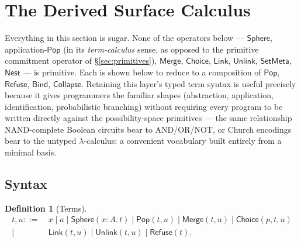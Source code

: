 \documentclass[12pt]{article}
\newcommand{\Sphere}{\mathsf{Sphere}}
\newcommand{\Pop}{\mathsf{Pop}}
\newcommand{\Merge}{\mathsf{Merge}}
\newcommand{\Choice}{\mathsf{Choice}}
\newcommand{\Nest}{\mathsf{Nest}}
\theoremstyle{definition}
\newtheorem{definition}{Definition}
\newcommand{\LinkOp}{\mathsf{Link}}
\newcommand{\UnlinkOp}{\mathsf{Unlink}}
\newcommand{\RefuseOp}{\mathsf{Refuse}}
\newcommand{\CollapseOp}{\mathsf{Collapse}}
\newcommand{\SetMetaOp}{\mathsf{SetMeta}}
\newcommand{\BindOp}{\mathsf{Bind}}
\begin{document}
\section{The Derived Surface Calculus}
\label{sec:surface-calculus}

Everything in this section is sugar. None of the operators below — $\Sphere$, application-$\Pop$ (in its \emph{term-calculus} sense, as opposed to the primitive commitment operator of \S\ref{sec:primitives}), $\Merge$, $\Choice$, $\LinkOp$, $\UnlinkOp$, $\SetMetaOp$, $\Nest$ — is primitive. Each is shown below to reduce to a composition of $\Pop$, $\RefuseOp$, $\BindOp$, $\CollapseOp$. Retaining this layer's typed term syntax is useful precisely because it gives programmers the familiar shapes (abstraction, application, identification, probabilistic branching) without requiring every program to be written directly against the possibility-space primitives — the same relationship NAND-complete Boolean circuits bear to AND/OR/NOT, or Church encodings bear to the untyped $\lambda$-calculus: a convenient vocabulary built entirely from a minimal basis.

\subsection{Syntax}
\begin{definition}[Terms]
\begin{align*}
t,u ::=~& x \mid a \mid \Sphere(x\!:\!A.\,t) \mid \Pop(t,u) \mid \Merge(t,u) \mid \Choice(p,t,u)\\
\mid~& \LinkOp(t,u) \mid \UnlinkOp(t,u) \mid \RefuseOp(t).
\end{align*}
\end{definition}
\end{document}
